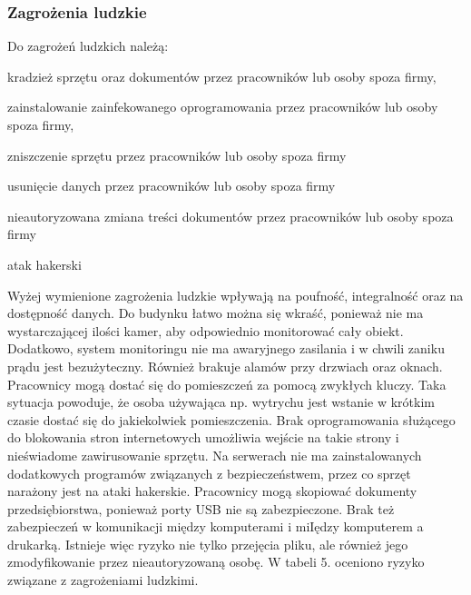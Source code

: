 \subsubsection{Zagrożenia ludzkie}
Do zagrożeń ludzkich należą: 
\begin{itemize*}
	\item kradzież sprzętu oraz dokumentów przez pracowników lub osoby spoza firmy,
	\item zainstalowanie zainfekowanego oprogramowania przez pracowników lub osoby spoza firmy,
	\item zniszczenie sprzętu przez pracowników lub osoby spoza firmy
	\item usunięcie danych przez pracowników lub osoby spoza firmy
	\item nieautoryzowana zmiana treści dokumentów przez pracowników lub osoby spoza firmy
	\item atak hakerski 
\end{itemize*}

Wyżej wymienione zagrożenia ludzkie wpływają na poufność, integralność oraz na dostępność danych. Do budynku łatwo można się wkraść, ponieważ nie ma wystarczającej ilości kamer, aby odpowiednio monitorować cały obiekt. Dodatkowo, system monitoringu nie ma awaryjnego zasilania i w chwili zaniku prądu jest bezużyteczny. Również brakuje alamów przy drzwiach oraz oknach. Pracownicy mogą dostać się do pomieszczeń za pomocą zwykłych kluczy. Taka sytuacja powoduje, że osoba używająca np. wytrychu jest wstanie w krótkim czasie dostać się do jakiekolwiek pomieszczenia. Brak oprogramowania służącego do blokowania stron internetowych umożliwia wejście na takie strony i nieświadome zawirusowanie sprzętu. Na serwerach nie ma zainstalowanych dodatkowych programów związanych z bezpieczeństwem, przez co sprzęt narażony jest na ataki hakerskie. Pracownicy mogą skopiować dokumenty przedsiębiorstwa, ponieważ porty USB nie są zabezpieczone. Brak też zabezpieczeń w komunikacji między komputerami i miIędzy komputerem a drukarką. Istnieje więc ryzyko nie tylko przejęcia pliku, ale również jego zmodyfikowanie przez nieautoryzowaną osobę.
W tabeli 5. oceniono ryzyko związane z zagrożeniami ludzkimi.

